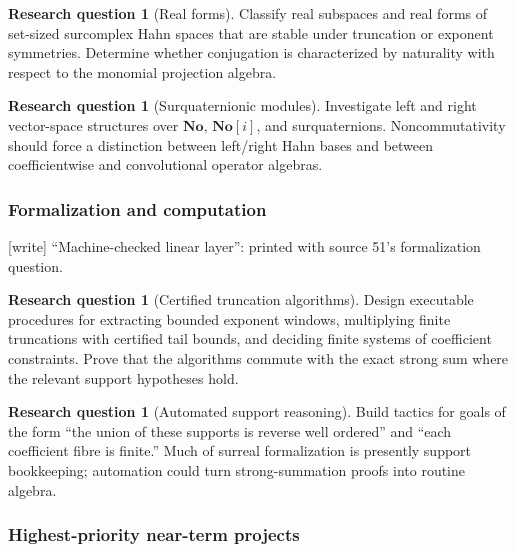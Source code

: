 \documentclass[11pt,letterpaper]{article}
\numberwithin{equation}{section}
\theoremstyle{definition}
\newtheorem{question}[theorem]{Research question}
\theoremstyle{remark}
\newcommand{\No}{\mathbf{No}}
\newcommand{\wtag}{\textup{[write]}}%
\begin{document}
\begin{question}[Real forms]
Classify real subspaces and real forms of set-sized surcomplex Hahn spaces that are
stable under truncation or exponent symmetries. Determine whether conjugation is
characterized by naturality with respect to the monomial projection algebra.
\end{question}

\begin{question}[Surquaternionic modules]
Investigate left and right vector-space structures over $\No$, $\No[i]$, and
surquaternions. Noncommutativity should force a distinction between left/right Hahn
bases and between coefficientwise and convolutional operator algebras.
\end{question}

\subsubsection{Formalization and computation}

\noindent\wtag{} ``Machine-checked linear layer'': printed with source 51's
formalization question.

\begin{question}[Certified truncation algorithms]
Design executable procedures for extracting bounded exponent windows, multiplying
finite truncations with certified tail bounds, and deciding finite systems of
coefficient constraints. Prove that the algorithms commute with the exact strong
sum where the relevant support hypotheses hold.
\end{question}

\begin{question}[Automated support reasoning]
Build tactics for goals of the form ``the union of these supports is reverse well
ordered'' and ``each coefficient fibre is finite.'' Much of surreal formalization
is presently support bookkeeping; automation could turn strong-summation proofs
into routine algebra.
\end{question}

\subsubsection{Highest-priority near-term projects}
\end{document}
